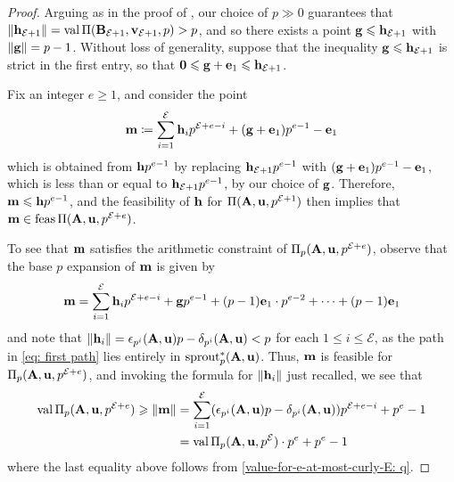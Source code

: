 \documentclass{amsart}
\begin{document}
\begin{proof}
   Arguing as in the proof of , our choice of $p \gg 0$ guarantees that $\| \mathbf{h}_{\mathcal{E}+1} \| = \operatorname{val}\Pi(\mathbf{B}_{\mathcal{E}+1}, \mathbf{v}_{\mathcal{E}+1},p) > p$, and so there exists a point $\mathbf{g} \leqslant \mathbf{h}_{\mathcal{E}+1}$ with $\| \mathbf{g} \| = p-1$.
   Without loss of generality, suppose that the inequality $\mathbf{g} \leqslant \mathbf{h}_{\mathcal{E}+1}$ is strict in the first entry, so that $\mathbf{0} \leqslant \mathbf{g} + \mathbf{e}_1 \leqslant \mathbf{h}_{\mathcal{E}+1}$.

   Fix an integer $e \geq 1$, and consider the point
   \[
      \mathbf{m} \coloneqq \sum_{i=1}^{\mathcal{E}} \mathbf{h}_i p^{\mathcal{E} + e-i} + (\mathbf{g}+\mathbf{e}_1)p^{e-1} - \mathbf{e}_1
   \]
   which is obtained from $\mathbf{h}p^{e-1}$ by replacing $\mathbf{h}_{\mathcal{E}+1}p^{e-1}$ with  $(\mathbf{g}+\mathbf{e}_1)p^{e-1} - \mathbf{e}_1$, which is less than or equal to $\mathbf{h}_{\mathcal{E}+1} p^{e-1}$, by our choice of $\mathbf{g}$.
   Therefore, $\mathbf{m} \leqslant \mathbf{h}p^{e-1}$, and the feasibility of $\mathbf{h}$ for $\Pi(\mathbf{A},\mathbf{u}, p^{\mathcal{E}+1})$ then implies that $\mathbf{m} \in \operatorname{feas} \Pi(\mathbf{A},\mathbf{u}, p^{\mathcal{E}+e})$.

   To see that $\mathbf{m}$ satisfies the arithmetic constraint of $\Pi_p(\mathbf{A},\mathbf{u}, p^{\mathcal{E}+e})$, observe that the base $p$ expansion of $\mathbf{m}$ is given by
   \[
      \mathbf{m} = \sum_{i=1}^{\mathcal{E}} \mathbf{h}_i p^{\mathcal{E} + e-i} + \mathbf{g}p^{e-1} + (p-1) \mathbf{e}_1 \cdot p^{e-2} + \cdots + (p-1)\mathbf{e}_1
   \]
   and note that $\| \mathbf{h}_i \| = \epsilon_{p^i}(\mathbf{A},\mathbf{u})p-\delta_{p^i}(\mathbf{A},\mathbf{u}) < p$ for each $1 \leq i \leq \mathcal{E}$, as the path in \eqref{eq: first path} lies entirely in $\operatorname{sprout}_p^{\ast}(\mathbf{A},\mathbf{u})$.
   Thus, $\mathbf{m}$ is feasible for $\Pi_p(\mathbf{A},\mathbf{u}, p^{\mathcal{E}+e})$, and invoking the formula for $\| \mathbf{h}_i \|$ just recalled, we see that
   \begin{align*}
     \operatorname{val} \Pi_p(\mathbf{A},\mathbf{u}, p^{\mathcal{E}+e}) \geqslant \| \mathbf{m} \| & = \sum_{i=1}^{\mathcal{E}} (\epsilon_{p^i}(\mathbf{A},\mathbf{u})p-\delta_{p^i}(\mathbf{A},\mathbf{u})) p^{\mathcal{E} + e-i} + p^e-1 \\
         & = \operatorname{val} \Pi_p(\mathbf{A},\mathbf{u}, p^{\mathcal{E}}) \cdot p^e + p^e-1
   \end{align*}
   where the last equality above follows from \eqref{value-for-e-at-most-curly-E: q}.
   

\end{proof}
\end{document}
